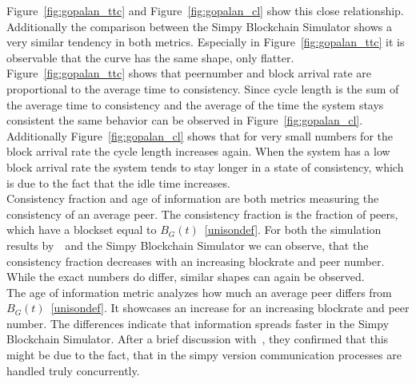 Figure~\ref{fig:gopalan_ttc} and Figure~\ref{fig:gopalan_cl} show this close relationship. Additionally the comparison between the Simpy Blockchain Simulator shows a very similar tendency in both metrics. Especially in Figure~\ref{fig:gopalan_ttc} it is observable that the curve has the same shape, only flatter. Figure~\ref{fig:gopalan_ttc} shows that peernumber and block arrival rate are proportional to the average time to consistency. Since cycle length is the sum of the average time to consistency and the average of the time the system stays consistent the same behavior can be observed in Figure~\ref{fig:gopalan_cl}. Additionally Figure~\ref{fig:gopalan_cl} shows that for very small numbers for the block arrival rate the cycle length increases again. When the system has a low block arrival rate the system tends to stay longer in a state of consistency, which is due to the fact that the idle time increases.\\
Consistency fraction and age of information are both metrics measuring the consistency of an average peer. The consistency fraction is the fraction of peers, which have a blockset equal to $B_G(t)$~\ref{unisondef}. For both the simulation results by~~and the Simpy Blockchain Simulator we can observe, that the consistency fraction decreases with an increasing blockrate and peer number. While the exact numbers do differ, similar shapes can again be observed.\\
The age of information metric analyzes how much an average peer differs from $B_G(t)$~\ref{unisondef}. It showcases an increase for an increasing blockrate and peer number.
The differences indicate that information spreads faster in the Simpy Blockchain Simulator. After a brief discussion with~, they confirmed that this might be due to the fact, that in the simpy version communication processes are handled truly concurrently.	

